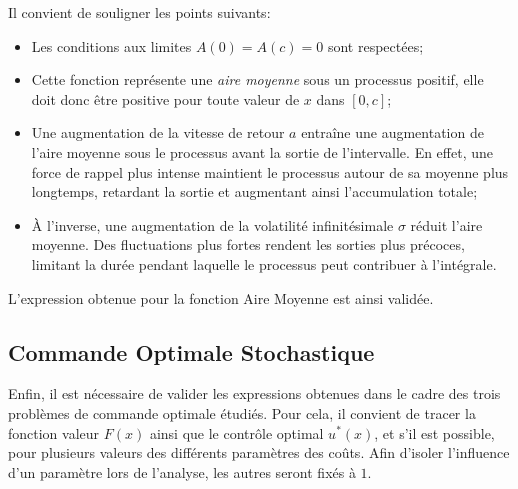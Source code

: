 Il convient de souligner les points suivants:
\begin{itemize}
    \item Les conditions aux limites $A(0)=A(c)=0$ sont respectées;
    \item Cette fonction représente une \textit{aire moyenne} sous un processus positif, elle doit donc être positive pour toute valeur de $x$ dans $[0,c]$;
    \item Une augmentation de la vitesse de retour $a$ entraîne une augmentation de l'aire moyenne sous le processus avant la sortie de l'intervalle. En effet, une force de rappel plus intense maintient le processus autour de sa moyenne plus longtemps, retardant la sortie et augmentant ainsi l'accumulation totale;
    \item À l'inverse, une augmentation de la volatilité infinitésimale $\sigma$ réduit l'aire moyenne. Des fluctuations plus fortes rendent les sorties plus précoces, limitant la durée pendant laquelle le processus peut contribuer à l'intégrale.
\end{itemize}

L'expression obtenue pour la fonction Aire Moyenne est ainsi validée.

\subsection{Commande Optimale Stochastique}

Enfin, il est nécessaire de valider les expressions obtenues dans le cadre des trois problèmes de commande optimale étudiés. Pour cela, il convient de tracer la fonction valeur $F(x)$ ainsi que le contrôle optimal $u^*(x)$, et s'il est possible, pour plusieurs valeurs des différents paramètres des coûts. Afin d'isoler l'influence d'un paramètre lors de l'analyse, les autres seront fixés à $1$.

